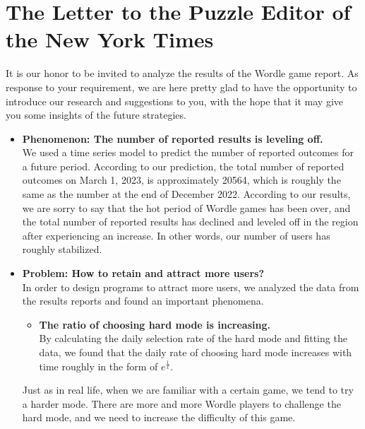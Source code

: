 \documentclass[12pt]{article}
\begin{document}
\section{The Letter to the Puzzle Editor of the New York Times}
\vspace{0.1cm} 
\vspace{0.1cm} 

It is our honor to be invited to analyze the results of the Wordle game report. As response to your requirement, we are here pretty glad to have the opportunity to introduce our research and suggestions to you, with the hope that it may give you some insights of the future strategies.

\begin{itemize}
        \item \textbf{Phenomenon:  The number of reported results is leveling off.}\\
        We used a time series model to predict the number of reported outcomes for a future period. According to our prediction, the total number of reported outcomes on March 1, 2023, is approximately 20564, which is roughly the same as the number at the end of December 2022. According to our results, we are sorry to say that the hot period of Wordle games has been over, and the total number of reported results has declined and leveled off in the region after experiencing an increase. In other words, our number of users has roughly stabilized.
   
        


        \item \textbf{Problem:  How to retain and attract more users?}
        \\
        In order to design programs to attract more users, we analyzed the data from the results reports and found an important phenomena.
        \begin{itemize}
            \item \textbf{The ratio of choosing hard mode is increasing.} 
            \\
            By calculating the daily selection rate of the hard mode and fitting the data, we found that the daily rate of choosing hard mode increases with time roughly in the form of $e^{\frac{1}{x}}$.
        \end{itemize}
        Just as in real life, when we are familiar with a certain game, we tend to try a harder mode. There are more and more Wordle players to challenge the hard mode, and we need to increase the difficulty of this game.



\end{itemize}
\end{document}
